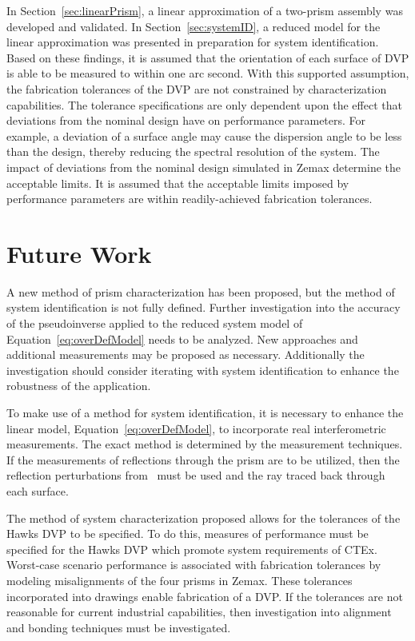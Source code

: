 In Section~\ref{sec:linearPrism}, a linear approximation of a two-prism assembly was developed and validated. In Section~\ref{sec:systemID}, a reduced model for the linear approximation was presented in preparation for system identification. Based on these findings, it is assumed that the orientation of each surface of \ac{DVP} is able to be measured to within one arc second. With this supported assumption, the fabrication tolerances of the \ac{DVP} are not constrained by characterization capabilities. The tolerance specifications are only dependent upon the effect that deviations from the nominal design have on performance parameters. For example, a deviation of a surface angle may cause the dispersion angle to be less than the design, thereby reducing the spectral resolution of the system. The impact of deviations from the nominal design simulated in Zemax determine the acceptable limits. It is assumed that the acceptable limits imposed by performance parameters are within readily-achieved fabrication tolerances.

\section{Future Work} 

A new method of prism characterization has been proposed, but the method of system identification is not fully defined. Further investigation into the accuracy of the pseudoinverse applied to the reduced system model of  Equation~\eqref{eq:overDefModel} needs to be analyzed. New approaches and additional measurements may be proposed as necessary. Additionally the investigation should consider iterating with system identification to enhance the robustness of the application.

To make use of a method for system identification, it is necessary to enhance the linear model, Equation~\eqref{eq:overDefModel}, to incorporate real interferometric measurements. The exact method is determined by the measurement techniques. If the measurements of reflections through the prism are to be utilized, then the reflection perturbations from~\cite{RedBreck} must be used and the ray traced back through each surface.

The method of system characterization proposed allows for the tolerances of the Hawks \ac{DVP} to be specified. To do this, measures of performance must be specified for the Hawks \ac{DVP} which promote system requirements of \ac{CTEx}. Worst-case scenario performance is associated with fabrication tolerances by modeling misalignments of the four prisms in Zemax. These tolerances incorporated into drawings enable fabrication of a \ac{DVP}. If the tolerances are not reasonable for current industrial capabilities, then investigation into alignment and bonding techniques must be investigated.

